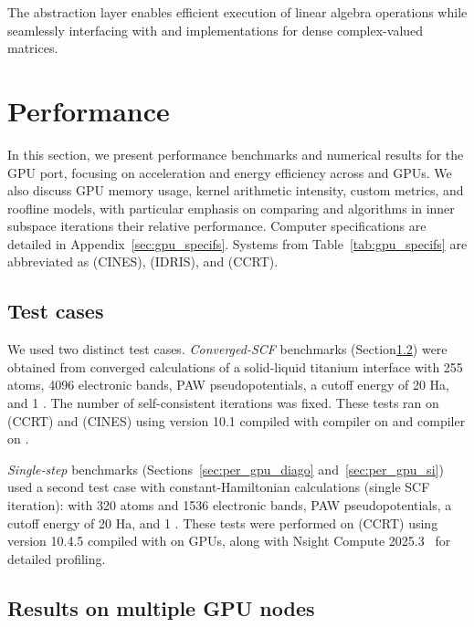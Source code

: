 \documentclass[twocolumn,superscriptaddress]{revtex4-1}
\begin{document}
The abstraction layer enables efficient execution of linear algebra operations while seamlessly interfacing with \blas and \lapack implementations for dense complex-valued matrices.

\section{Performance}\label{sec:perfs}

In this section, we present performance benchmarks and numerical results for the \abinit GPU port, focusing on acceleration and energy efficiency across \nvidia and \amd GPUs. We also discuss GPU memory usage, kernel arithmetic intensity, custom metrics, and roofline models, with particular emphasis on comparing \lobpcg and \chebyshevfiltering algorithms in inner subspace iterations their relative performance.
Computer specifications are detailed in Appendix~\ref{sec:gpu_specifs}. Systems from Table~\ref{tab:gpu_specifs} are abbreviated as \adastra (CINES), \jeanzay (IDRIS), and \topaze (CCRT).

\subsection{Test cases}

We used two distinct test cases. \textit{Converged-SCF} benchmarks (Section\ref{sec:multiple_gpu}) were obtained from converged calculations of a solid-liquid titanium interface with 255 atoms, 4096 electronic bands, PAW pseudopotentials, a cutoff energy of 20 Ha, and 1 \kpoint. The number of self-consistent iterations was fixed. These tests ran on \topaze (CCRT) and \adastra (CINES) using \abinit version 10.1 compiled with \nvhpc compiler on \nvidia and \cray compiler on \amd.

\textit{Single-step} benchmarks (Sections~\ref{sec:per_gpu_diago} and~\ref{sec:per_gpu_si}) used a second test case with constant-Hamiltonian calculations (single SCF iteration):  with 320 atoms and 1536 electronic bands, PAW pseudopotentials, a cutoff energy of 20 Ha, and 1 \kpoint. These tests were performed on \topaze (CCRT) using \abinit version 10.4.5 compiled with \nvhpc on \nvidia GPUs, along with Nsight Compute 2025.3~\cite{nvidia_nsight_compute} for detailed profiling.

\subsection{Results on multiple GPU nodes}\label{sec:multiple_gpu}
\end{document}
